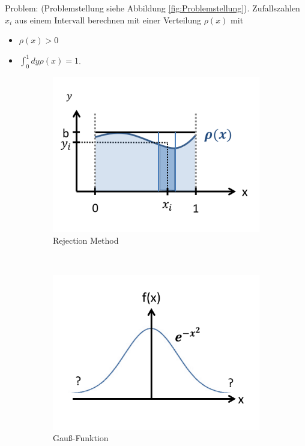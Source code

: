 \documentclass[12pt]{article}
\begin{document}
 
 Problem: (Problemstellung siehe Abbildung \ref{fig:Problemstellung}).
 Zufallszahlen $x_i$ aus einem Intervall berechnen mit einer Verteilung $\rho(x)$ mit
 \begin{itemize}
 \item $\rho(x)>0$
 \item $\int_0^1 dy \rho(x)=1$.
\end{itemize} 
 

 
 \begin{figure}[h] 
		\begin{subfigure}[h]{0.5 \textwidth}
		\centering
		\includegraphics[width=\textwidth]{Folie23.png}
		\caption{Rejection Method} 
		\label{fig:Neumann}
		\centering
	\end{subfigure}
	~
\begin{subfigure}[h]{0.5\textwidth}
		\centering
		\includegraphics[width=\textwidth]{Folie24.png}
		\caption{Gauß-Funktion}
		\label{fig:Gaussunktion}
		\centering
	\end{subfigure}
	\caption{ }
\end{figure}	
\end{document}
